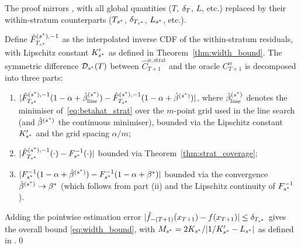 The proof mirrors \citet[Theorem~3]{xu2023conformal},
with all global quantities ($T$, $\delta_T$, $L$, etc.) replaced
by their within-stratum counterparts
($T_{s^*}$, $\delta_{T_{s^*}}$, $L_{s^*}$, etc.).

\medskip
Define $\hat{F}_{T_{s^*}}^{(s^*),-1}$ as the interpolated inverse
CDF of the within-stratum residuals, with Lipschitz constant
$K'_{s^*}$ as defined in Theorem~\ref{thm:width_bound}.
The symmetric difference $\mathcal{D}_{s^*}(T)$ between
$\hat{C}_{T+1}^{\alpha,\text{strat}}$ and the oracle $C_{T+1}^\alpha$
is decomposed into three parts:
\begin{enumerate}
  \item[(i)] $|\hat{F}_{T_{s^*}}^{(s^*),-1}(1-\alpha+\hat{\beta}_{\text{line}}^{(s^*)})
    - \hat{F}_{T_{s^*}}^{(s^*),-1}(1-\alpha+\hat{\beta}^{(s^*)})|$,
    where $\hat{\beta}_{\text{line}}^{(s^*)}$ denotes the
    minimiser of~\eqref{eq:betahat_strat} over the $m$-point
    grid used in the line search (and $\hat{\beta}^{(s^*)}$
    the continuous minimiser),
    bounded via the Lipschitz constant $K'_{s^*}$
    and the grid spacing $\alpha/m$;
  \item[(ii)] $|\hat{F}_{T_{s^*}}^{(s^*),-1}(\cdot) - F_{s^*}^{-1}(\cdot)|$
    bounded via Theorem~\ref{thm:strat_coverage};
  \item[(iii)] $|F_{s^*}^{-1}(1-\alpha+\hat{\beta}^{(s^*)})
    - F_{s^*}^{-1}(1-\alpha+\beta^*)|$
    bounded via the convergence $\hat{\beta}^{(s^*)} \to \beta^*$
    (which follows from part (ii) and the Lipschitz continuity
    of $F_{s^*}^{-1}$).
\end{enumerate}
Adding the pointwise estimation error $|\hat{f}_{-(T+1)}(x_{T+1})
- f(x_{T+1})| \leq \delta_{T_{s^*}}$ gives the overall bound
\eqref{eq:width_bound}, with
$M_{s^*} = 2K_{s^*}/|1/K'_{s^*} - L_{s^*}|$
as defined in \citet[proof of Theorem~3]{xu2023conformal}.\qed
